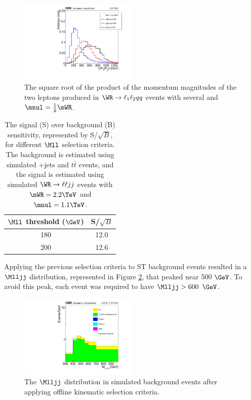 \begin{figure}[h]
	\centering
	\includegraphics[width=0.5\textwidth]{figures/sqrtProdGenLeptMomentumMag_several_MWR_and_MNu_private.pdf}
	\caption{The square root of the product of the momentum magnitudes of the two leptons produced in $\WR \rightarrow \ell_{1}\ell_{2} qq$ 
		events with several \mWR and $\mnul = \frac{1}{2}\mWR$.}
	\label{fig:wrLeptSqrtMomMagVarMNu}
\end{figure}

\begin{table}[h]
	\caption{The signal (S) over background (B) sensitivity, represented by S/$\sqrt{B}$, for different $\Mll$ selection 
		criteria.  The background is estimated using simulated \DY+jets and $t\bar{t}$ events, and the 
		signal is estimated using simulated $\WR \rightarrow \ell\ell jj$ events with $\mWR = 2.2 \TeV$ and $\mnul = 1.1 \TeV$.}
	\label{tab:lowerMllCut}
	\centering
	\begin{tabular}{c|c}
		$\Mll$ threshold ($\GeV$) & S/$\sqrt{B}$ \\  \hline
		180 &  12.0  \\
		200 &  12.6  \\ \hline
	\end{tabular}
\end{table}

Applying the previous selection criteria to ST background events resulted in a $\Mlljj$ distribution, represented in Figure 
\ref{fig:sculptedMlljj}, that peaked near 500 $\GeV$.  To avoid this peak, each event was required to have $\Mlljj > 600$ $\GeV$.

\begin{figure}[h]
	\centering
	\includegraphics[width=0.5\textwidth]{figures/Mlljj_varBins_SignalRegion_EEChannelBkgndMC_DYMadHTAndIncl_TTBarFromData_log.pdf}
	\caption{The $\Mlljj$ distribution in simulated background events after applying offline kinematic selection criteria.}
	\label{fig:sculptedMlljj}
\end{figure}

